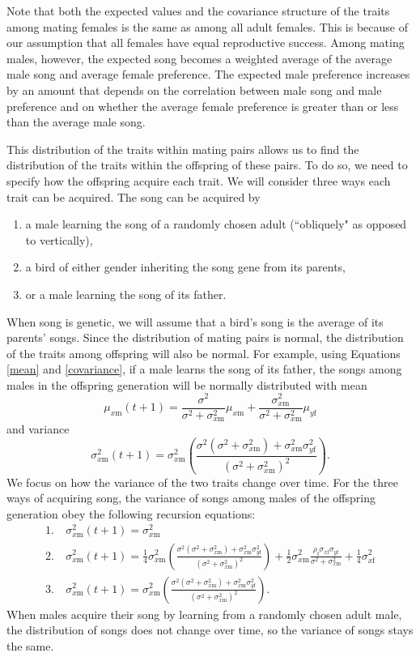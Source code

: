 \documentclass{article}
\newcommand{\x}[1]{\text{#1}}
\begin{document}
Note that both the expected values and the covariance structure of the traits among  mating females is the same as among all adult females. This is because of our assumption that all females have equal reproductive success. Among mating males, however, the expected song becomes a weighted average of the average male song and average female preference. The expected male preference increases by an amount that depends on the correlation between male song and male preference and on whether the average female preference is greater than or less than the average male song.

This distribution of the traits within mating pairs allows us to find the distribution of the traits within the offspring of these pairs. To do so, we need to specify how the offspring acquire each trait. We will consider three ways each trait can be acquired. The song can be acquired by 
\begin{enumerate}
\item a male learning the song of a randomly chosen adult (``obliquely" as opposed to vertically),
\item a bird of either gender inheriting the song gene from its parents, 
\item or a male learning the song of its father.
\end{enumerate}
When song is genetic, we will assume that a bird's song is the average of its parents' songs. Since the distribution of mating pairs is normal, the distribution of the traits among offspring will also be normal. For example, using Equations \ref{mean} and  \ref{covariance}, if a male learns the song of its father, the songs among males in the offspring generation will be normally distributed with mean $$\mu_{x\x{m}}(t+1)=\frac{\sigma^2}{\sigma^2+\sigma_{x\x{m}}^2}\mu_{x\x{m}}+\frac{\sigma_{x\x{m}}^2}{\sigma^2+\sigma_{x\x{m}}^2}\mu_{y\x{f}}$$ and variance $$\sigma_{x\x{m}}^2(t+1)=\sigma_{x\x{m}}^2\left(\frac{\sigma^2(\sigma^2+\sigma_{x\x{m}}^2)+\sigma_{ x\x{m}}^2\sigma_{y\x{f}}^2}{(\sigma^2+\sigma_{x\x{m}}^2)^2}\right).$$
We focus on how the variance of the two traits change over time. For the three ways of acquiring song, the variance of songs among males of the offspring generation obey the following recursion equations: 
\begin{align*}
1. \ &\sigma_{x\x{m}}^2(t+1)=\sigma_{x\x{m}}^2
\\ 2. \ &\sigma_{x\x{m}}^2(t+1)=\frac{1}{4}\sigma_{x\x{m}}^2\left(\frac{\sigma^2(\sigma^2+\sigma_{x\x{m}}^2)+\sigma_{ x\x{m}}^2\sigma_{y\x{f}}^2}{(\sigma^2+\sigma_{x\x{m}}^2)^2}\right)+\frac{1}{2}\sigma_{x\x{m}}^2\frac{\rho_\x{f}\sigma_{x\x{f}}\sigma_{y\x{f}}}{\sigma^2+\sigma_{x\x{m}}^2}+\frac{1}{4}\sigma_{x\x{f}}^2
\\3. \ &\sigma_{x\x{m}}^2(t+1)=\sigma_{x\x{m}}^2\left(\frac{\sigma^2(\sigma^2+\sigma_{x\x{m}}^2)+\sigma_{ x\x{m}}^2\sigma_{y\x{f}}^2}{(\sigma^2+\sigma_{x\x{m}}^2)^2}\right).
\end{align*}
When males acquire their song by learning from a randomly chosen adult male, the distribution of songs does not change over time, so the variance of songs stays the same. 
\end{document}
